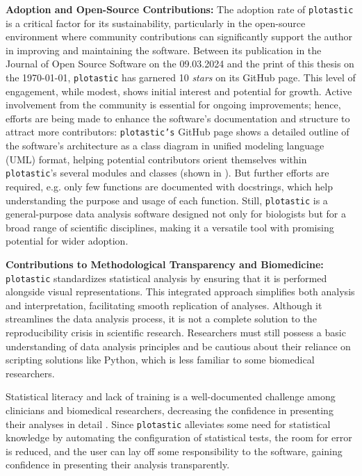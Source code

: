 \textbf{Adoption and Open-Source Contributions:}
The adoption rate of \texttt{plotastic} is a critical factor for its
sustainability, particularly in the open-source environment where community
contributions can significantly support the author in improving and maintaining
the software. Between its publication in the Journal of Open Source Software on
the 09.03.2024 and the print of this thesis on the \today, \texttt{plotastic}
has garnered 10 \emph{stars}  on its GitHub page. This level of engagement,
while modest, shows initial interest and potential for growth. Active
involvement from the community is essential for ongoing improvements; hence,
efforts are being made to enhance the software's documentation and structure to
attract more contributors: \texttt{plotastic's} GitHub page shows a detailed
outline of the software's architecture as a class diagram in unified modeling
language (UML) format, helping potential contributors orient themselves within
\texttt{plotastic}'s several modules and classes (shown in
). But further efforts are required, e.g. only few
functions are documented with docstrings, which help understanding the purpose
and usage of each function. Still, \texttt{plotastic} is a general-purpose data
analysis software designed not only for biologists but for a broad range of
scientific disciplines, making it a versatile tool with promising potential for
wider adoption.





\textbf{Contributions to Methodological Transparency and Biomedicine:}
\texttt{plotastic} standardizes statistical analysis by ensuring that it is
performed alongside visual representations. This integrated approach simplifies
both analysis and interpretation, facilitating smooth replication of analyses.
Although it streamlines the data analysis process, it is not a complete solution
to the reproducibility crisis in scientific research. Researchers must still
possess a basic understanding of data analysis principles and be cautious about
their reliance on scripting solutions like Python, which is less familiar to
some biomedical researchers.

Statistical literacy and lack of training is a well-documented challenge among
clinicians and biomedical researchers, decreasing the confidence in
presenting their analyses in detail
\cite{lakhlifiIllusionKnowledgeStatistics2023, federerDataLiteracyTraining2016}.
Since \texttt{plotastic} alleviates some need for statistical knowledge by
automating the configuration of statistical tests, the room for error is
reduced, and the user can lay off some responsibility to the software, gaining
confidence in presenting their analysis transparently.

